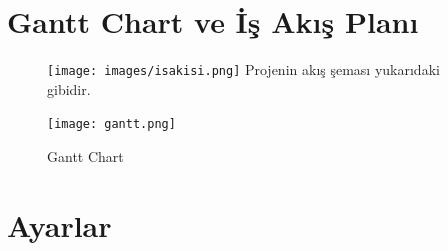 \documentclass[12pt,a4paper]{article}
\begin{document}
	     	
	\newpage
		\section{Gantt Chart ve İş Akış Planı \newline} 
	\begin{figure}[!htbp] 		
		\centering
		\texttt{[image: images/isakisi.png]}\newline
		Projenin akış şeması yukarıdaki gibidir.\newline
	\end{figure}
	\begin{figure}[!htbp]
		\centering
		\caption{Gantt Chart}
		\centering
		\texttt{[image: gantt.png]}\newline
		\label{gantt}		
	\end{figure}  
		\section{Ayarlar \newline} 
		
\end{document}
